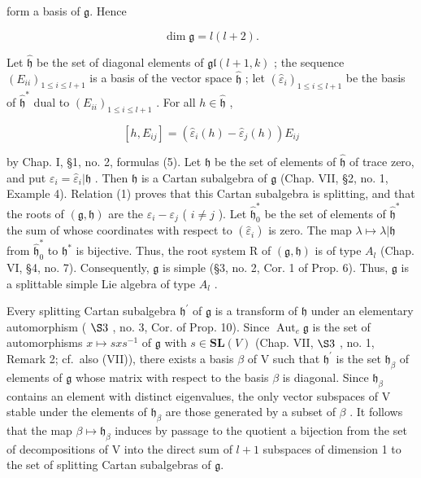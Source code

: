 form a basis of \(\mathfrak{g}\). Hence

\[
\dim \mathfrak {g} = l (l + 2).
\]

Let \(\hat{\mathfrak{h}}\) be the set of diagonal elements of \(\mathfrak{gl}(l + 1,k)\) ; the sequence \((E_{ii})_{1\leq i\leq l + 1}\) is a basis of the vector space \(\hat{\mathfrak{h}}\) ; let \((\hat{\varepsilon}_i)_{1\leq i\leq l + 1}\) be the basis of \(\hat{\mathfrak{h}}^*\) dual to \((E_{ii})_{1\leq i\leq l + 1}\) . For all \(h\in \hat{\mathfrak{h}}\) ,

\[
[ h, E _ {i j} ] = (\hat {\varepsilon} _ {i} (h) - \hat {\varepsilon} _ {j} (h)) E _ {i j}\tag{1}
\]

by Chap. I, §1, no. 2, formulas (5). Let \(\mathfrak{h}\) be the set of elements of \(\hat{\mathfrak{h}}\) of trace zero, and put \(\varepsilon_i = \hat{\varepsilon}_i|\mathfrak{h}\) . Then \(\mathfrak{h}\) is a Cartan subalgebra of \(\mathfrak{g}\) (Chap. VII, §2, no. 1, Example 4). Relation (1) proves that this Cartan subalgebra is splitting, and that the roots of \((\mathfrak{g},\mathfrak{h})\) are the \(\varepsilon_i - \varepsilon_j\) ( \(i\neq j\) ). Let \(\hat{\mathfrak{h}}_0^*\) be the set of elements of \(\hat{\mathfrak{h}}^*\) the sum of whose coordinates with respect to \((\hat{\varepsilon}_i)\) is zero. The map \(\lambda \mapsto \lambda |\mathfrak{h}\) from \(\hat{\mathfrak{h}}_0^*\) to \(\mathfrak{h}^*\) is bijective. Thus, the root system R of \((\mathfrak{g},\mathfrak{h})\) is of type \(A_l\) (Chap. VI, §4, no. 7). Consequently, \(\mathfrak{g}\) is simple (§3, no. 2, Cor. 1 of Prop. 6). Thus, \(\mathfrak{g}\) is a splittable simple Lie algebra of type \(A_l\) .

Every splitting Cartan subalgebra \(\mathfrak{h}^{\prime}\) of \(\mathfrak{g}\) is a transform of \(\mathfrak{h}\) under an elementary automorphism ( \(\S3\) , no. 3, Cor. of Prop. 10). Since \(\operatorname{Aut}_{e}\mathfrak{g}\) is the set of automorphisms \(x \mapsto sxs^{-1}\) of \(\mathfrak{g}\) with \(s \in \mathbf{SL}(V)\) (Chap. VII, \(\S3\) , no. 1, Remark 2; cf.~also (VII)), there exists a basis \(\beta\) of V such that \(\mathfrak{h}^{\prime}\) is the set \(\mathfrak{h}_{\beta}\) of elements of \(\mathfrak{g}\) whose matrix with respect to the basis \(\beta\) is diagonal. Since \(\mathfrak{h}_{\beta}\) contains an element with distinct eigenvalues, the only vector subspaces of V stable under the elements of \(\mathfrak{h}_{\beta}\) are those generated by a subset of \(\beta\) . It follows that the map \(\beta \mapsto \mathfrak{h}_{\beta}\) induces by passage to the quotient a bijection from the set of decompositions of V into the direct sum of \(l + 1\) subspaces of dimension 1 to the set of splitting Cartan subalgebras of \(\mathfrak{g}\).

